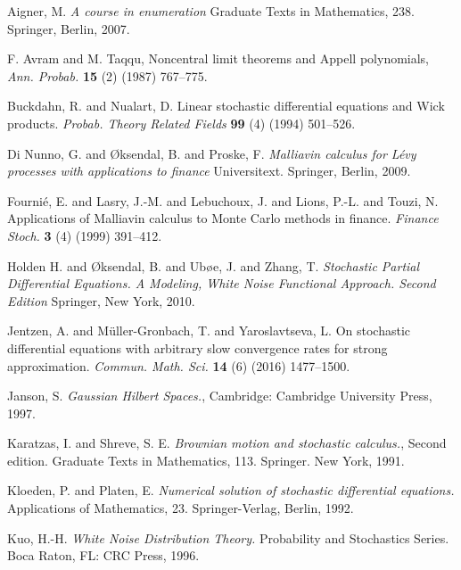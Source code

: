 \documentclass[a4paper,11pt,reqno]{amsart}
\theoremstyle{plain}
\numberwithin{equation}{section}
\begin{document}
\begin{thebibliography}{plain}

 Aigner, M.
\textit{A course in enumeration} Graduate Texts in Mathematics, 238. Springer, Berlin, 2007.

 F. Avram and M. Taqqu, Noncentral limit theorems and Appell polynomials, \textit{Ann. Probab.} \textbf{15} (2) (1987) 767--775. 


 Buckdahn, R. and Nualart, D. Linear stochastic differential equations and Wick products. \textit{Probab. Theory Related Fields} \textbf{99} (4) (1994) 501--526.


 Di Nunno, G. and {\O}ksendal, B. and Proske, F. \textit{Malliavin calculus for L\'{e}vy processes with applications to finance} Universitext. Springer, Berlin, 2009.

 Fourni\'e, E. and Lasry, J.-M. and Lebuchoux, J. and Lions, P.-L. and Touzi, N.
Applications of Malliavin calculus to Monte Carlo methods in finance. 
\textit{Finance Stoch.} \textbf{3} (4) (1999) 391--412.



 Holden H. and {\O}ksendal, B. and Ub{\o}e, J. and Zhang, T.
\textit{Stochastic Partial Differential Equations. A Modeling, White Noise
    Functional Approach. Second Edition} Springer, New York, 2010.



 Jentzen, A. and M\"uller-Gronbach, T. and Yaroslavtseva, L.
On stochastic differential equations with arbitrary slow convergence rates for strong approximation. \textit{Commun. Math. Sci.} \textbf{14} (6) (2016) 1477--1500.


 Janson, S.
\textit{Gaussian Hilbert Spaces.}, Cambridge: Cambridge University Press, 1997.


 Karatzas, I. and Shreve, S. E.
\textit{Brownian motion and stochastic calculus.},
Second edition. Graduate Texts in Mathematics, 113. Springer. New York, 1991.

Kloeden, P. and Platen, E. \textit{Numerical solution of stochastic differential equations.}
Applications of Mathematics, 23. Springer-Verlag, Berlin, 1992.


 Kuo, H.-H.
\textit{White Noise Distribution Theory.}
Probability and Stochastics Series. Boca Raton, FL: CRC Press, 1996.



\end{thebibliography}
\end{document}
